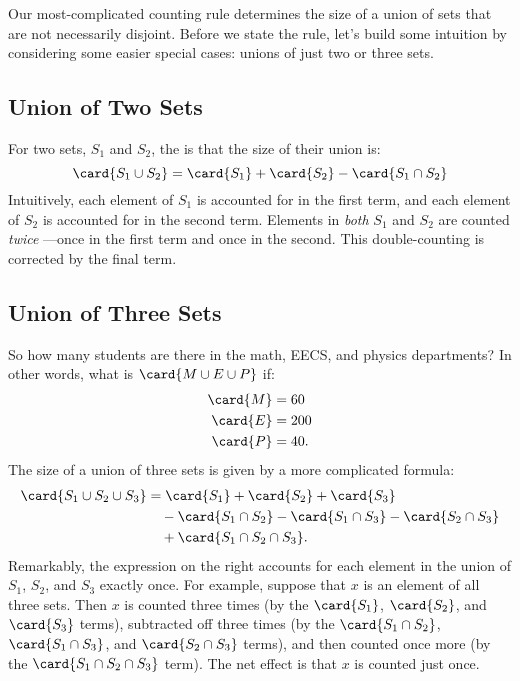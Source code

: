 Our most-complicated counting rule determines the size of a union of
sets that are not necessarily disjoint.  Before we state the rule,
let's build some intuition by considering some easier special cases:
unions of just two or three sets.

\subsection{Union of Two Sets}

For two sets, $S_1$ and $S_2$, the  is that the
size of their union is:
\begin{equation}\label{IE2}
\card{S_1 \cup S_2} = \card{S_1} + \card{S_2} - \card{S_1 \cap S_2}
\end{equation}
Intuitively, each element of $S_1$ is accounted for in the first term,
and each element of $S_2$ is accounted for in the second term.
Elements in \emph{both} $S_1$ and $S_2$ are counted
\emph{twice} ---once in the first term and once in the second.  This
double-counting is corrected by the final term.

\subsection{Union of Three Sets}

So how many students are there in the math, EECS, and physics
departments?  In other words, what is $\card{M \cup E \cup P}$ if:
%
\begin{align*}
\card{M} & = 60 \\
\card{E} & = 200 \\
\card{P} & = 40.
\end{align*}
%
The size of a union of three sets is given by a more complicated
 formula:
%
\begin{align*}
\card{S_1 \cup S_2 \cup S_3} & = \card{S_1} + \card{S_2} + \card{S_3} \\
  & \quad - \card{S_1 \cap S_2} - \card{S_1 \cap S_3} - \card{S_2 \cap S_3} \\
  & \quad + \card{S_1 \cap S_2 \cap S_3}.
\end{align*}
%
Remarkably, the expression on the right accounts for each element in the
union of $S_1$, $S_2$, and $S_3$ exactly once.  For example, suppose that
$x$ is an element of all three sets.  Then $x$ is counted three times (by
the $\card{S_1}$, $\card{S_2}$, and $\card{S_3}$ terms), subtracted off
three times (by the $\card{S_1 \cap S_2}$, $\card{S_1 \cap S_3}$, and
$\card{S_2 \cap S_3}$ terms), and then counted once more (by the
$\card{S_1 \cap S_2 \cap S_3}$ term).  The net effect is that $x$ is
counted just once.

